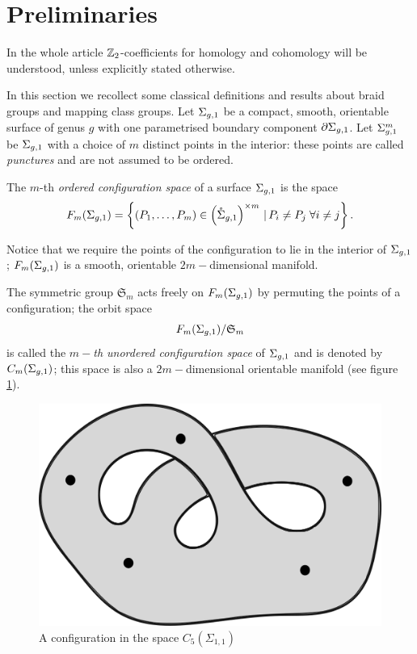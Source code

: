 \section{Preliminaries}
\label{sec:Preliminaries}
In the whole article $\mathbb{Z}_2$-coefficients for homology and cohomology will be understood,
unless explicitly stated otherwise.

In this section we recollect some classical definitions and results about braid groups and mapping class groups.
Let $\Sigma_{g,1}$ be a compact, smooth, orientable surface of genus $g$ with one parametrised
boundary component $\partial \Sigma_{g,1}$. Let $\Sigma_{g,1}^m$ be $\Sigma_{g,1}$ with a choice of $m$ distinct
points in the interior: these points are called \emph{punctures} and are not assumed to be ordered.

\begin{defn}
\label{defn:cms}
 The $m$-th \emph{ordered configuration space} of a surface $\Sigma_{g,1}$ is the space
\[
 F_m(\Sigma_{g,1})=\left\{(P_1,\dots,P_m) \in \left(\mathring{\Sigma}_{g,1}\right)^{\times m}  \,|\,  P_i\neq P_j  \;\forall i\neq j\right\}.
\]

 Notice that we require the points of the configuration to lie in the interior of $\Sigma_{g,1}$;
 $F_m(\Sigma_{g,1})$ is a smooth, orientable $2m-$dimensional manifold.
 
 The symmetric group $\mathfrak{S}_m$ acts freely on $F_m(\Sigma_{g,1})$ by permuting the points of a configuration;
 the orbit space
 \[
 F_m(\Sigma_{g,1})/\mathfrak{S}_m
 \]
 is called the \emph{$m-$th unordered configuration space}
 of $\Sigma_{g,1}$ and is denoted by $C_m(\Sigma_{g,1})$; this space is also a $2m-$dimensional orientable manifold
 (see figure \ref{fig:unordered}).
 
%  
\end{defn}

\begin{figure}\centering
 \includegraphics[scale=0.8]{figures/unordered.png}
 \caption{A configuration in the space $C_5(\Sigma_{1,1})$}
\label{fig:unordered}
\end{figure}


